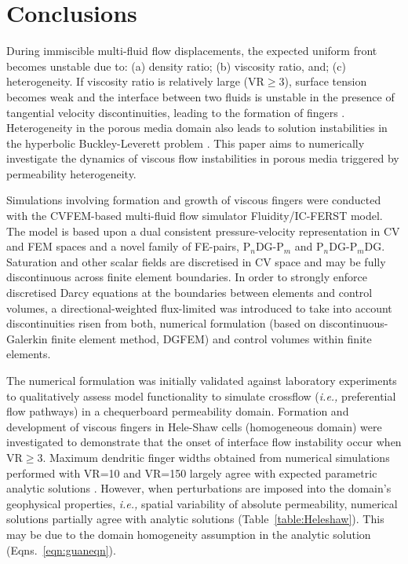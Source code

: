 \documentclass[preprint,authoryear,12pt]{elsarticle}
\newcommand{\PN}[2][error]{P$_{#1}$DG-P$_{#2}$}
\newcommand{\PNDG}[2][error]{P$_{#1}$DG-P$_{#2}$DG}
\newcommand{\ie}{{\it i.e., }}
\begin{document}
\section{Conclusions}\label{Section:Conclusion}
During immiscible multi-fluid flow displacements, the expected uniform front becomes unstable due to: (a) density ratio; (b) viscosity ratio, and; (c) heterogeneity. If viscosity ratio is relatively large (VR$\ge$3), surface tension becomes weak and the interface between two fluids is unstable in the presence of tangential velocity discontinuities, leading to the formation of fingers \citep{saffman_1986}. Heterogeneity in the porous media domain  also leads to solution instabilities in the hyperbolic Buckley-Leverett problem \citep{langtangen_1992}. This paper aims to numerically investigate the dynamics of viscous flow instabilities in porous media triggered by permeability heterogeneity. 

\medskip
Simulations involving formation and growth of viscous fingers were conducted with the CVFEM-based multi-fluid flow simulator Fluidity/IC-FERST model. The model is based upon a dual consistent pressure-velocity representation in CV and FEM spaces and a novel family of FE-pairs, \PN[n]{m} and \PNDG[n]{m}. Saturation and other scalar fields are discretised in CV space and may be fully discontinuous across finite element boundaries. In order to strongly enforce discretised Darcy equations at the boundaries between elements and control volumes, a directional-weighted flux-limited was introduced to take into account discontinuities risen from both, numerical formulation (based on discontinuous-Galerkin finite element method, DGFEM) and control volumes within finite elements.

\medskip
The numerical formulation was initially validated against laboratory experiments \citep{dawe_2008} to qualitatively assess model functionality to simulate crossflow (\ie preferential flow pathways) in a chequerboard permeability domain. Formation and development of viscous fingers in Hele-Shaw cells (homogeneous domain) were investigated to demonstrate that the onset of interface flow instability occur when VR$\ge$3. Maximum dendritic finger widths obtained from numerical simulations performed with VR=10 and VR=150 largely agree with expected parametric analytic solutions \citep{mclean_1981,guan_2003}. However, when perturbations are imposed into the domain's geophysical properties, \ie spatial variability of absolute permeability, numerical solutions partially agree with analytic solutions (Table~\ref{table:Heleshaw}). This may be due to the domain homogeneity assumption in the analytic solution (Eqns.~\ref {eqn:guaneqn}).
\end{document}
